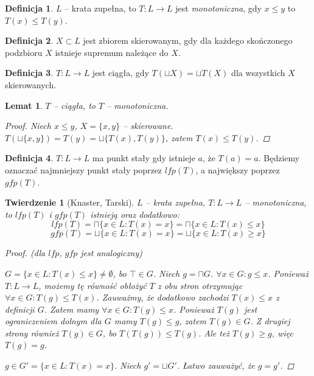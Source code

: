 \documentclass[10pt,a4paper]{article}
\theoremstyle{plain}
\newtheorem{theorem}{Twierdzenie}
\newtheorem{lemma}{Lemat}
\theoremstyle{definition}
\newtheorem*{definition}{Definicja}
\begin{document}
\begin{definition}
$L$ -- krata zupełna, to $T : L \to L$ jest \emph{monotoniczna}, gdy $x \leq y$ to $T(x) \leq T(y)$.
\end{definition}

\begin{definition}
$X \subset L$ jest zbiorem skierowanym, gdy dla każdego skończonego podzbioru $X$ istnieje supremum należące do $X$.
\end{definition}

\begin{definition}
$T : L \to L$ jest ciągła, gdy $T(\sqcup X) = \sqcup T(X)$ dla wszystkich $X$ skierowanych.
\end{definition}

\begin{lemma}
$T$ -- ciągła, to $T$ -- monotoniczna.
\begin{proof}
Niech $x \leq y$, $X = \lbrace x, y \rbrace$ -- skierowane.
$T(\sqcup \lbrace x, y \rbrace) = T(y) = \sqcup \lbrace T(x), T(y) \rbrace$, zatem $T(x) \leq T(y)$.
\end{proof}
\end{lemma}

\begin{definition}
$T : L \to L$ ma punkt stały gdy istnieje $a$, że $T(a) = a$. Będziemy oznaczać najmniejszy punkt stały poprzez $lfp(T)$,
 a największy poprzez $gfp(T)$.
\end{definition}

\begin{theorem}[Knaster, Tarski]
$L$ -- krata zupełna, $T : L \to L$ -- monotoniczna, to $lfp(T)$ i $gfp(T)$ istnieją oraz dodatkowo:
\[ lfp(T) = \sqcap \lbrace x \in L : T(x) = x \rbrace = \sqcap \lbrace x \in L : T(x) \leq x \rbrace \]
\[ gfp(T) = \sqcup \lbrace x \in L : T(x) = x \rbrace = \sqcup \lbrace x \in L : T(x) \geq x \rbrace \]

\begin{proof}{(dla $lfp$, $gfp$ jest analogiczny)}

$G = \lbrace x \in L : T(x) \leq x \rbrace \neq \emptyset$, bo $\top \in G$. Niech $g = \sqcap G$.
$\forall x \in G : g \leq x$. Ponieważ $T : L \to L$, możemy tę równość obłożyć $T$ z obu stron otrzymując
$\forall x \in G : T(g) \leq T(x)$. Zauważmy, że dodatkowo zachodzi $T(x) \leq x$ z definicji $G$. Zatem mamy
$\forall x \in G : T(g) \leq x$. Ponieważ $T(g)$ jest ograniczeniem dolnym dla $G$ mamy $T(g) \leq g$, zatem $T(g) \in G$.
Z drugiej strony również $T(g) \in G$, bo $T(T(g)) \leq T(g)$. Ale też $T(g) \geq g$, więc $T(g) = g$.

$g \in G' = \lbrace x \in L : T(x) = x \rbrace$. Niech $g' = \sqcup G'$. Łatwo zauważyć, że $g = g'$.
\end{proof}
\end{theorem}
\end{document}
